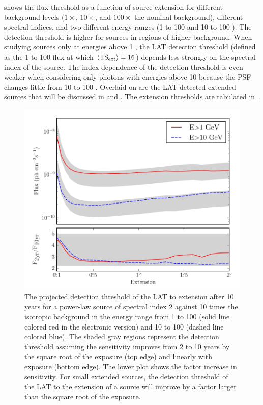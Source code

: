  shows the flux threshold as a function of
source extension for different background levels ($1\times$, $10\times$,
and $100\times$ the nominal background), different spectral indices,
and two different energy ranges (1 \gev to 100 \gev and 10 \gev to
100 \gev).  The detection threshold is higher for sources in regions of
higher background.  When studying sources only at energies above 1 \gev,
the LAT detection threshold (defined as the 1 \gev to 100 \gev flux at
which $\langle\mathrm{TS}_\mathrm{ext}\rangle=16$) depends less strongly on the spectral
index of the source.  The index dependence of the detection threshold is
even weaker when considering only photons with energies above 10 \gev
because the PSF changes little from 10 \gev to 100 \gev.  Overlaid on
 are the LAT-detected extended sources that will
be discussed in  and .
The extension thresholds are tabulated in .

\begin{figure}[htbp]
  \includegraphics{chapters/extended_analysis/figures/mc_plots/time_sensitivity_color.pdf}
  \caption{The projected detection threshold of the LAT to extension
  after 10 years for a power-law source of spectral index 2 against 10
  times the isotropic background in the energy range from 1 \gev to
  100 \gev (solid line colored red in the electronic version) and 10
  \gev to 100 \gev (dashed line colored blue). The shaded gray regions
  represent the detection threshold assuming the sensitivity improves
  from 2 to 10 years by the square root of the exposure (top edge)
  and linearly with exposure (bottom edge).  The lower plot shows
  the factor increase in sensitivity.  For small extended sources,
  the detection threshold of the LAT to the extension of a source will
  improve by a factor larger than the square root of the exposure.}
\end{figure}

